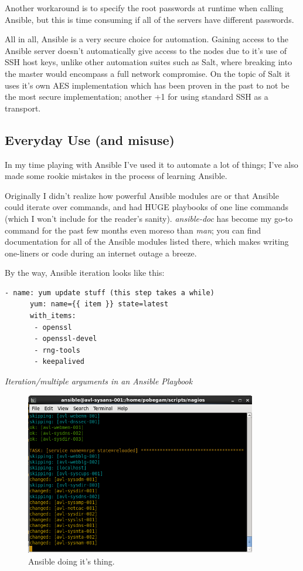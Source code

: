 \documentclass[a4paper]{article}
\begin{document}
Another workaround is to specify the root passwords at runtime when calling Ansible, but this is time consuming if all of the servers have different passwords.

All in all, Ansible is a very secure choice for automation. Gaining access to the Ansible server doesn't automatically give access to the nodes due to it's use of SSH host keys, unlike other automation suites such as Salt, where breaking into the master would encompass a full network compromise. On the topic of Salt it uses it's own AES implementation which has been proven in the past to not be the most secure implementation; another +1 for using standard SSH as a transport.

\subsection{Everyday Use (and misuse)}

In my time playing with Ansible I've used it to automate a lot of things; I've also made some rookie mistakes in the process of learning Ansible.

Originally I didn't realize how powerful Ansible modules are or that Ansible could iterate over commands, and had HUGE playbooks of one line commands (which I won't include for the reader's sanity). \textit{ansible-doc} has become my go-to command for the past few months even moreso than \textit{man}; you can find documentation for all of the Ansible modules listed there, which makes writing one-liners or code during an internet outage a breeze. 

By the way, Ansible iteration looks like this:
\begin{lstlisting}[language=nagconf]
    - name: yum update stuff (this step takes a while)
      yum: name={{ item }} state=latest
      with_items:
       - openssl
       - openssl-devel
       - rng-tools
       - keepalived
\end{lstlisting}
\hfill \textit{Iteration/multiple arguments in an Ansible Playbook}\\

\begin{figure}[H]
\centering
\includegraphics[width=0.9\textwidth]{ansible-in-action.png}
\caption{\label{fig:ansinact}Ansible doing it's thing.}
\end{figure}
\end{document}
